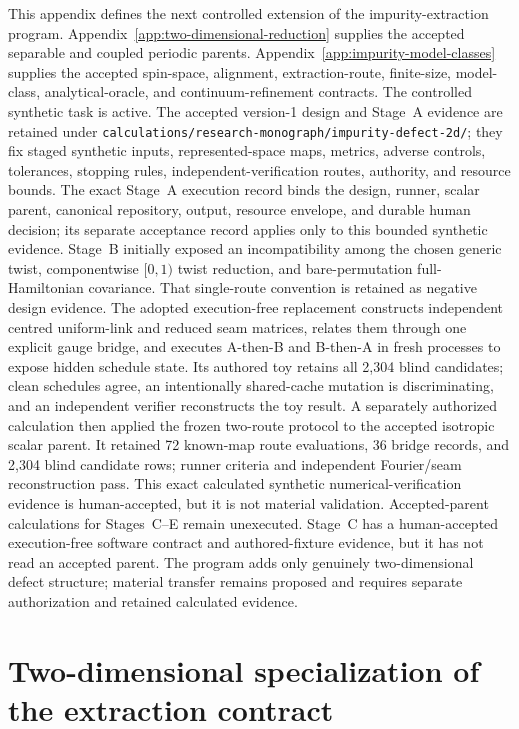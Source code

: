 This appendix defines the next controlled extension of the impurity-extraction
program. Appendix~\ref{app:two-dimensional-reduction} supplies the accepted
separable and coupled periodic parents. Appendix~\ref{app:impurity-model-classes}
supplies the accepted spin-space, alignment, extraction-route, finite-size,
model-class, analytical-oracle, and continuum-refinement contracts. The
controlled synthetic task is active. The accepted version-1 design and Stage~A
evidence are retained under
\texttt{calculations/research-monograph/impurity-defect-2d/}; they fix staged
synthetic inputs, represented-space maps, metrics, adverse controls, tolerances,
stopping rules, independent-verification routes, authority, and resource
bounds. The exact Stage~A execution record binds the design, runner, scalar
parent, canonical repository, output, resource envelope, and durable human
decision; its separate acceptance record applies only to this bounded synthetic
evidence. Stage~B initially exposed an incompatibility among the chosen generic
twist, componentwise $[0,1)$ twist reduction, and bare-permutation
full-Hamiltonian covariance. That single-route convention is retained as
negative design evidence. The adopted execution-free replacement constructs
independent centred uniform-link and reduced seam matrices, relates them through
one explicit gauge bridge, and executes A-then-B and B-then-A in fresh processes
to expose hidden schedule state. Its authored toy retains all 2,304 blind
candidates; clean schedules agree, an intentionally shared-cache mutation is
discriminating, and an independent verifier reconstructs the toy result. A
separately authorized calculation then applied the frozen two-route protocol to
the accepted isotropic scalar parent. It retained 72 known-map route
evaluations, 36 bridge records, and 2,304 blind candidate rows; runner criteria
and independent Fourier/seam reconstruction pass. This exact calculated
synthetic numerical-verification evidence is human-accepted, but it is not
material validation. Accepted-parent calculations for Stages~C--E remain
unexecuted. Stage~C has a human-accepted execution-free software contract and authored-fixture evidence,
but it has not read an accepted parent. The program adds only genuinely
two-dimensional defect structure; material transfer remains proposed and
requires separate authorization and retained calculated evidence.

\section{Two-dimensional specialization of the extraction contract}

